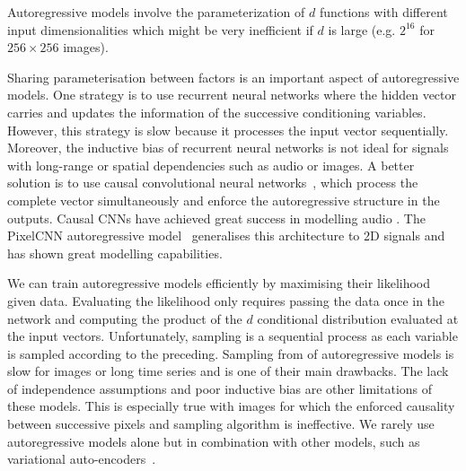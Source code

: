 Autoregressive models involve the parameterization of $d$ functions with different input dimensionalities which might be very inefficient if $d$ is large (e.g. $2^{16}$ for $256\times256$ images).

Sharing parameterisation between factors is an important aspect of autoregressive models. One strategy is to use recurrent neural networks where the hidden vector carries and updates the information of the successive conditioning variables\citep{van2016pixel}. However, this strategy is slow because it processes the input vector sequentially. Moreover, the inductive bias of recurrent neural networks is not ideal for signals with long-range or spatial dependencies such as audio or images. A better solution is to use causal convolutional neural networks~\citep[][Causal CNNs]{oord2016wavenet}, which process the complete vector simultaneously and enforce the autoregressive structure in the outputs. Causal CNNs have achieved great success in modelling audio \citep{van_den_oord_wavenet_2016, van_den_oord_parallel_2018}. The PixelCNN autoregressive model~\citep{oord_conditional_2016} generalises this architecture to 2D signals and has shown great modelling capabilities.

We can train autoregressive models efficiently by maximising their likelihood given data. Evaluating the likelihood only requires passing the data once in the network and computing the product of the $d$ conditional distribution evaluated at the input vectors. Unfortunately, sampling is a sequential process as each variable is sampled according to the preceding. Sampling from  of autoregressive models is slow for images or long time series and is one of their main drawbacks. The lack of independence assumptions and poor inductive bias are other limitations of these models. This is especially true with images for which the enforced causality between successive pixels and sampling algorithm is ineffective. We rarely use autoregressive models alone but in combination with other models, such as variational auto-encoders~\citep{kingma_auto-encoding_2013}.

